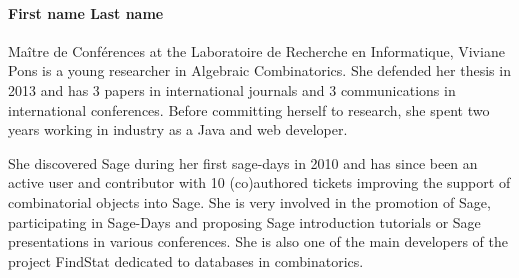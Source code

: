 \paragraph{First name Last name}

%

%

Maître de Conférences at the Laboratoire de Recherche en Informatique, 
Viviane Pons is a young researcher in Algebraic Combinatorics. She defended
her thesis in 2013 and has 3 papers in international journals and 3 
communications in international conferences. Before committing herself
to research, she spent two years working in industry as a Java and web
developer.

She discovered Sage during her first sage-days in 2010 and has since 
been an active user and contributor with 10 (co)authored tickets improving
the support of combinatorial objects into Sage. She is very involved in 
the promotion of Sage, participating in Sage-Days and proposing Sage
introduction tutorials or Sage presentations in various conferences. 
She is also one of the main developers of the project FindStat dedicated 
to databases in combinatorics.
